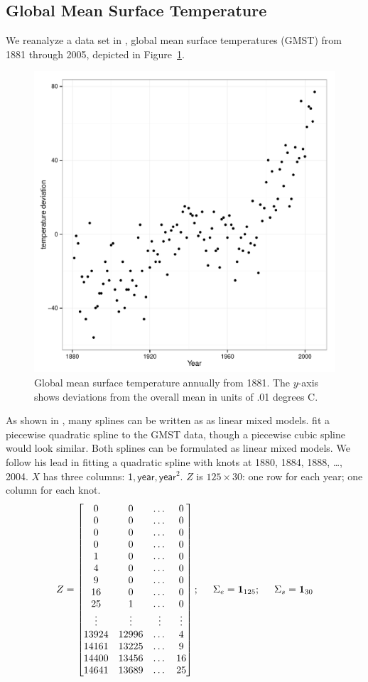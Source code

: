 \documentclass{report}
\newcommand{\textcompute}{\textsf}
\begin{document}
\subsection{Global Mean Surface Temperature}
We reanalyze a data set in \cite{hodges:2013}, global mean surface temperatures (GMST) from 1881 through 2005, depicted in Figure~\ref{fig:gmst-scatter}.  
\begin{figure}
	\centering
	\includegraphics[width=.5\linewidth]{figs/gmst-scatter.pdf}
	\caption{Global mean surface temperature annually from 1881.
		The $y$-axis shows deviations from the overall mean in units of
		.01 degrees C.}
	\label{fig:gmst-scatter}
\end{figure}
As shown in \cite{ruppert_etal:2003}, many splines can be written as as linear mixed models.  \cite{hodges:2013} fit a piecewise quadratic spline to the GMST data, though a piecewise cubic spline would look similar.  Both splines can be formulated as linear mixed models.  We follow his lead in fitting a quadratic spline with knots at 1880, 1884, 1888, \dots, 2004.  $X$ has three columns: $\textcompute{1}, \textcompute{year}, \textcompute{year}^2$.  $Z$ is $125 \times 30$: one row for each year; one column for each knot.
\begin{equation*}
Z =	\begin{bmatrix}
		0 & 0 & \dots & 0\\
		0 & 0 & \dots & 0\\
		0 & 0 & \dots & 0\\
		0 & 0 & \dots & 0\\
		1 & 0 & \dots & 0\\
		4 & 0 & \dots & 0\\
		9 & 0 & \dots & 0\\
		16 & 0 & \dots & 0\\
		25 & 1 & \dots & 0\\
		\vdots & \vdots & \vdots & \vdots\\
		13924 & 12996 & \dots & 4\\
		14161 & 13225 & \dots & 9\\
		14400 & 13456 & \dots & 16\\
		14641 & 13689 & \dots & 25\\
	\end{bmatrix}; \hspace{.5cm} \Sigma_e = \mathbf{1}_{125}; \hspace{.5cm}
		\Sigma_s = \mathbf{1}_{30}
\end{equation*}
\end{document}
